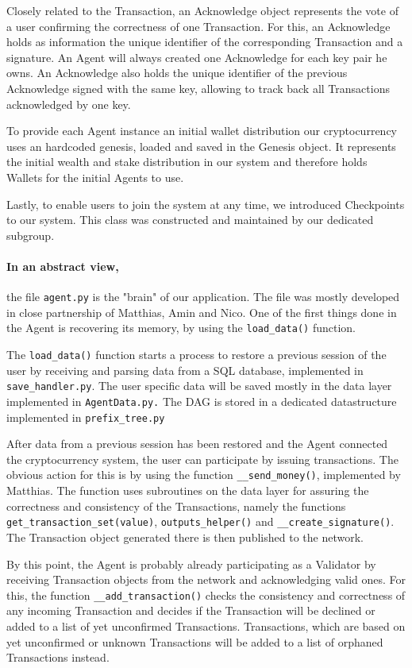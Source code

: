 Closely related to the Transaction, an Acknowledge object represents the vote of a user confirming the correctness of one Transaction. For this, an Acknowledge holds as information the unique identifier of the corresponding Transaction and a signature. An Agent will always created one Acknowledge for each key pair he owns. An Acknowledge also holds the unique identifier of the previous Acknowledge signed with the same key, allowing to track back all Transactions acknowledged by one key.

To provide each Agent instance an initial wallet distribution our cryptocurrency uses an hardcoded genesis, loaded and saved in the Genesis object. It represents the initial wealth and stake distribution in our system and therefore holds Wallets for the initial Agents to use.

Lastly, to enable users to join the system at any time, we introduced Checkpoints to our system. This class was constructed and maintained by our dedicated subgroup. 

\paragraph{In an abstract view,} the file \texttt{agent.py} is the "brain" of our application. The file was mostly developed in close partnership of Matthias, Amin and Nico. One of the first things done in the Agent is recovering its memory, by using the \texttt{load\_data()} function. 

The \texttt{load\_data()} function starts a process to restore a previous session of the user by receiving and parsing data from a SQL database, implemented in \texttt{save\_handler.py}. The user specific data will be saved mostly in the data layer implemented in \texttt{AgentData.py.} The DAG is stored in a dedicated datastructure implemented in \texttt{prefix\_tree.py}

After data from a previous session has been restored and the Agent connected the cryptocurrency system, the user can participate by issuing transactions. The obvious action for this is by using the function \texttt{\_\_send\_money()}, implemented by Matthias. The function uses subroutines on the data layer for assuring the correctness and consistency of the Transactions, namely the functions \texttt{get\_transaction\_set(value)}, \texttt{outputs\_helper()} and \texttt{\_\_create\_signature()}. The Transaction object generated there is then published to the network.

By this point, the Agent is probably already participating as a Validator by receiving Transaction objects from the network and acknowledging valid ones. For this, the function \texttt{\_\_add\_transaction()} checks the consistency and correctness of any incoming Transaction and decides if the Transaction will be declined or added to a list of yet unconfirmed Transactions. Transactions, which are based on yet unconfirmed or unknown Transactions will be added to a list of orphaned Transactions instead.

